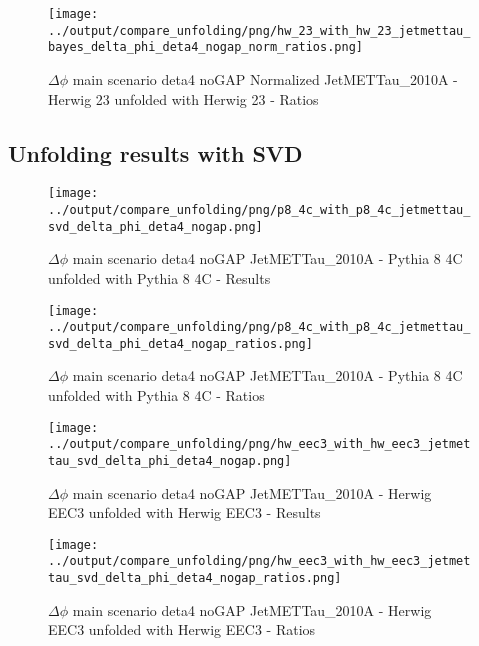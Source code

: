 \documentclass[11pt]{book}
\begin{document}
\begin{figure}[ht]
\centering
\texttt{[image: ../output/compare\_unfolding/png/hw\_23\_with\_hw\_23\_jetmettau\_bayes\_delta\_phi\_deta4\_nogap\_norm\_ratios.png]}
\caption{$\Delta\phi$ main scenario deta4 noGAP Normalized JetMETTau\_2010A - Herwig 23 unfolded with Herwig 23 - Ratios}
\label{hw_23_hw_23_jetmettau_bayes_delta_phi_deta4_nogap_norm_b}
\end{figure}


\clearpage
\subsection{Unfolding results with SVD}

\begin{figure}[ht]
\centering
\texttt{[image: ../output/compare\_unfolding/png/p8\_4c\_with\_p8\_4c\_jetmettau\_svd\_delta\_phi\_deta4\_nogap.png]}
\caption{$\Delta\phi$ main scenario deta4 noGAP JetMETTau\_2010A - Pythia 8 4C unfolded with Pythia 8 4C - Results}
\label{p8_p8_jetmettau_svd_delta_phi_deta4_nogap_a}
\end{figure}

\begin{figure}[ht]
\centering
\texttt{[image: ../output/compare\_unfolding/png/p8\_4c\_with\_p8\_4c\_jetmettau\_svd\_delta\_phi\_deta4\_nogap\_ratios.png]}
\caption{$\Delta\phi$ main scenario deta4 noGAP JetMETTau\_2010A - Pythia 8 4C unfolded with Pythia 8 4C - Ratios}
\label{p8_p8_jetmettau_svd_delta_phi_deta4_nogap_b}
\end{figure}

\begin{figure}[ht]
\centering
\texttt{[image: ../output/compare\_unfolding/png/hw\_eec3\_with\_hw\_eec3\_jetmettau\_svd\_delta\_phi\_deta4\_nogap.png]}
\caption{$\Delta\phi$ main scenario deta4 noGAP JetMETTau\_2010A - Herwig EEC3 unfolded with Herwig EEC3 - Results}
\label{hw_eec3_hw_eec3_jetmettau_svd_delta_phi_deta4_nogap_a}
\end{figure}

\begin{figure}[ht]
\centering
\texttt{[image: ../output/compare\_unfolding/png/hw\_eec3\_with\_hw\_eec3\_jetmettau\_svd\_delta\_phi\_deta4\_nogap\_ratios.png]}
\caption{$\Delta\phi$ main scenario deta4 noGAP JetMETTau\_2010A - Herwig EEC3 unfolded with Herwig EEC3 - Ratios}
\label{hw_eec3_hw_eec3_jetmettau_svd_delta_phi_deta4_nogap_b}
\end{figure}
\end{document}
